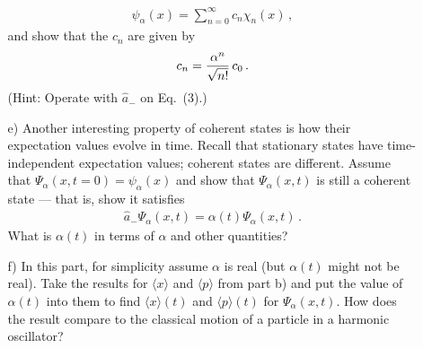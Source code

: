 \documentclass[11pt]{article}
\begin{document}
\begin{itemize}
\begin{itemize}
\begin{eqnarray}
\psi_\alpha(x) = \sum_{n=0}^\infty c_n \chi_n(x) \,,
\end{eqnarray}
and show that the $c_n$ are given by
\begin{eqnarray}
c_n = {\alpha^n \over \sqrt{n!}} \, c_0 \,.
\end{eqnarray}
(Hint: Operate with ${\hat a}_-$ on Eq.\ (3).)
\item[e)]
Another interesting property of coherent states is how their expectation values evolve in time.  Recall that stationary states have time-independent expectation values; coherent states are different.
Assume that $\Psi_\alpha(x, t=0) = \psi_\alpha(x)$ and show that $\Psi_\alpha(x,t)$ is still a coherent state --- that is, show it satisfies
\begin{eqnarray}
{\hat a}_- \Psi_\alpha (x,t ) = \alpha(t) \Psi_\alpha(x,t) \,.
\end{eqnarray}
What is $\alpha(t)$ in terms of $\alpha$ and other quantities?
\item[f)]
In this part, for simplicity assume $\alpha$ is real (but $\alpha(t)$ might not be real).  Take the results for $\langle x \rangle$ and $\langle p \rangle$ from part b) and put the value of $\alpha(t)$ into them to find $\langle x \rangle(t)$ and $\langle p \rangle (t)$  for $\Psi_\alpha(x,t)$.   How does the result compare to the classical motion of a particle in a harmonic oscillator?
\end{itemize}
\end{itemize}
\end{document}
